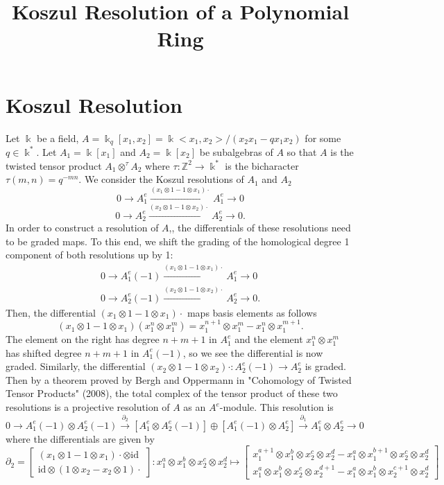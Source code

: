 \documentclass[12pt,a4paper]{article}
\title{Koszul Resolution of a Polynomial Ring}
\date{}
\newcommand\ZZ{\mathbb{Z}}
\newcommand{\kk}{\Bbbk}
\newcommand\1{_{(1)}}
\newcommand\2{_{(2)}}
\begin{document}
\maketitle

\section{Koszul Resolution}

Let $\kk$ be a field, $A=\kk_q[x_1,x_2]=\kk<x_1,x_2>/(x_2x_1-qx_1x_2)$ for some $q\in\kk^*$.
Let $A_1=\kk[x_1]$ and $A_2=\kk[x_2]$ be subalgebras of $A$ so that $A$ is the twisted tensor product $A_1\otimes^\tau A_2$ where $\tau:\ZZ^2\to\kk^*$ is the bicharacter $\tau(m,n)= q^{-mn}$.
We consider the Koszul resolutions of $A_1$ and $A_2$
\[
  0\to A_1^e\xrightarrow{(x_1\otimes 1-1\otimes x_1)\cdot}A_1^e\to 0
\]
\[
0\to A_2^e\xrightarrow{(x_2\otimes 1-1\otimes x_2)\cdot}A_2^e\to 0.  
\]
In order to construct a resolution of $A$,, the differentials of these resolutions need to be graded maps.
To this end, we shift the grading of the homological degree 1 component of both resolutions up by 1:
\begin{align*}
0\to A_1^e(-1)\xrightarrow{(x_1\otimes 1-1\otimes x_1)\cdot}A_1^e\to 0\\
0\to A_2^e(-1)\xrightarrow{(x_2\otimes 1-1\otimes x_2)\cdot}A_2^e\to 0.  
\end{align*}
Then, the differential $(x_1\otimes 1-1\otimes x_1)\cdot$ maps basis elements as follows
\[
(x_1\otimes 1-1\otimes x_1)(x_1^n\otimes x_1^m)=x_1^{n+1}\otimes x_1^m-x_1^n\otimes x_1^{m+1}.
\]
The element on the right has degree $n+m+1$ in $A_1^e$ and the element $x_1^n\otimes x_1^m$ has shifted degree $n+m+1$ in $A_1^e(-1)$, so we see the differential is now graded.
Similarly, the differential $(x_2\otimes 1-1\otimes x_2)\cdot:A_2^e(-1)\to A_2^e$ is graded.
\\

Then by a theorem proved by Bergh and Oppermann in "Cohomology of Twisted Tensor Products" (2008), the total complex of the tensor product of these two resolutions is a projective resolution of $A$ as an $A^e$-module.
This resolution is 
\[
0\to A_1^e(-1)\otimes A_2^e(-1)\xrightarrow{\partial_2}\left[A_1^e\otimes A_2^e(-1)\right]\oplus \left[A_1^e(-1)\otimes A_2^e\right]\xrightarrow{\partial_1}A_1^e\otimes A_2^e\to 0
\]
where the differentials are given by
\[
\partial_2=\begin{bmatrix}(x_1\otimes 1-1\otimes x_1)\cdot\otimes \text{id}\\\text{id}\otimes(1\otimes x_2-x_2\otimes 1)\cdot\end{bmatrix}:x_1^a\otimes x_1^b\otimes x_2^c\otimes x_2^d\mapsto\begin{bmatrix}x_1^{a+1}\otimes x_1^b\otimes x_2^c\otimes x_2^d-x_1^a\otimes x_1^{b+1}\otimes x_2^c\otimes x_2^d\\ x_1^a\otimes x_1^b\otimes x_2^c\otimes x_2^{d+1}-x_1^a\otimes x_1^b\otimes x_2^{c+1}\otimes x_2^d\end{bmatrix}
\]
\end{document}
